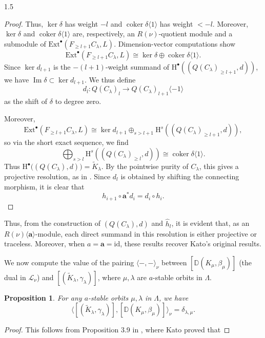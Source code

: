 \documentclass[10pt]{amsart}
\newtheorem{proposition}[theorem]{Proposition}
\begin{document}
\begin{spacing}{1.5}
\begin{proof}
Thus, $\ker \delta$ has weight $-l$ and $\operatorname{coker} \delta \langle 1 \rangle$ has weight $< -l$. Moreover, $\ker \delta$ and $\operatorname{coker} \delta \langle 1 \rangle$ are, respectively, an $R(\nu)$-quotient module and a submodule of $\mathrm{Ext}^{\bullet}(F_{\geq l+1} C_{\lambda}, L)$. Dimension-vector computations show
\[
\mathrm{Ext}^{\bullet}(F_{\geq l+1} C_{\lambda}, L) \cong \ker \delta \oplus \operatorname{coker} \delta \langle 1 \rangle.
\]
Since $\ker d_{l+1}$ is the $-(l+1)$-weight summand of $\mathrm{H}^{\bullet}((Q(C_{\lambda})_{\geq l+1}, d))$, we have $\operatorname{Im} \delta \subset \ker d_{l+1}$. We thus define
\[
d_l : Q(C_{\lambda})_l \to Q(C_{\lambda})_{l+1} \langle -1 \rangle
\]
as the shift of $\delta$ to degree zero.

Moreover,
\[
\mathrm{Ext}^{\bullet}(F_{\geq l+1} C_{\lambda}, L) \cong \ker d_{l+1} \oplus_{s>l+1} \mathrm{H}^s((Q(C_{\lambda})_{\geq l+1}, d)),
\]
so via the short exact sequence, we find
\[
\bigoplus_{s>l} \mathrm{H}^s((Q(C_{\lambda})_{\geq l}, d)) \cong \operatorname{coker} \delta \langle 1 \rangle.
\]
Thus $\mathrm{H}^{\bullet}\bigl((Q(C_{\lambda}), d)\bigr) = \widetilde{K}_{\lambda}$. By the pointwise purity of $C_{\lambda}$, this gives a projective resolution, as in \cite[Proposition 2.8]{cd088214-009e-3813-9a86-97f9a299a24c}.
Since $d_l$ is obtained by shifting the connecting morphism, it is clear that
\[
h_{i+1} \circ \mathbf{a}^* d_i = d_i \circ h_i.
\]
\end{proof}

Thus, from the construction of $(Q(C_{\lambda}), d)$ and $\hat{h}_l$, it is evident that, as an $R(\nu)\langle\mathbf{a}\rangle$-module, each direct summand in this resolution is either projective or traceless. Moreover, when $a =\mathbf{a}= \mathrm{id}$, these results recover Kato's original results.

We now compute the value of the pairing $\langle -, - \rangle_{\nu}$ between $[\mathbb{D}(K_{\mu}, \beta_{\mu})]$ (the dual in $\mathcal{L}_{\nu}$) and $[(\widetilde{K}_{\lambda}, \gamma_{\lambda})]$, where $\mu, \lambda$ are $a$-stable orbits in $\Lambda$.

\begin{proposition}
    For any $a$-stable orbits $\mu, \lambda$ in $\Lambda$, we have
    \[
        \langle [(\widetilde{K}_{\lambda}, \gamma_{\lambda})], [\mathbb{D}(K_{\mu}, \beta_{\mu})] \rangle_{\nu} = \delta_{\lambda, \mu}.
    \]
\end{proposition}

\begin{proof}
This follows from Proposition 3.9 in \cite{cd088214-009e-3813-9a86-97f9a299a24c}, where Kato proved that


\end{proof}
\end{spacing}
\end{document}
